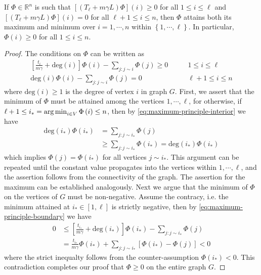 \documentclass[letterpaper]{article} %
\begin{document}
\begin{lemma}
  \label{lem:maximum-principle}
  If $\Phi\in\mathbb{R}^n$ is such that $\left[\left( T_{\ell}+m\gamma L \right)\Phi\right] \left(i\right)\geq 0$ for all $1\leq i\leq \ell$ and $\left[\left( T_{\ell}+m\gamma L \right)\Phi\right] \left(i\right)=0$ for all $\ell+1\leq i\leq n$, then $\Phi$ attains both its maximum and minimum over $i=1,\cdots,n$ within $\left\{ 1,\cdots,\ell \right\}$. In particular, $\Phi\left(i\right)\geq 0$ for all $1\leq i\leq n$.
\end{lemma}
\begin{proof}
  The conditions on $\Phi$ can be written as
  \begin{align}
      \left[\frac{t_i}{m\gamma}+\mathrm{deg}\left(i\right)\right]\Phi \left( i \right)-\sum_{j:j\sim i}\Phi \left( j \right)\geq 0 & \qquad 1\leq i\leq \ell\label{eq:maximum-principle-boundary}\\
      \mathrm{deg}\left(i\right)\Phi \left( i \right)-\sum_{j:j\sim i}\Phi \left( j \right)=0 & \qquad \ell+1\leq i\leq n\label{eq:maximum-principle-interior}
  \end{align}
  where $\mathrm{deg}\left( i \right)\geq 1$ is the degree of vertex $i$ in graph $G$. First, we assert that the minimum of $\Phi$ must be attained among the vertices $1,\cdots,\ell$, for otherwise, if $\ell+1\leq i_*=\mathop{\rm arg\, min}_{i\in V}\Phi \left( i \right)\leq n$, then by \eqref{eq:maximum-principle-interior} we have
  \begin{equation*}
    \begin{aligned}
      \mathrm{deg}\left(i_*\right)\Phi \left( i_* \right)&=\sum_{j:j\sim i_*}\Phi \left( j \right)\\
      &\geq \sum_{j:j\sim i_*}\Phi \left( i_* \right)=\mathrm{deg}\left(i_*\right)\Phi \left( i_* \right)
    \end{aligned}
  \end{equation*}
which implies $\Phi \left( j \right)=\Phi \left( i_* \right)$ for all vertices $j\sim i_*$. This argument can be repeated until the constant value propagates into the vertices within $1,\cdots,\ell$, and the assertion follows from the connectivity of the graph. The assertion for the maximum can be established analogously. Next we argue that the minimum of $\Phi$ on the vertices of $G$ must be non-negative. Assume the contracy, i.e. the minimum attained at $i_*\in \left[ 1,\ell \right]$ is strictly negative, then by \eqref{eq:maximum-principle-boundary} we have
\begin{equation*}
  \begin{aligned}
    0 &\leq \left[\frac{t_{i_*}}{m\gamma}+\mathrm{deg}\left(i_{*}\right)\right]\Phi \left( i_{*} \right)-\sum_{j:j\sim i_{*}}\Phi \left( j \right)\\
    &=\frac{t_{i_*}}{m\gamma}\Phi \left( i_* \right)+\sum_{j:j\sim i_*}\left[ \Phi \left( i_* \right)-\Phi \left( j \right) \right]<0
  \end{aligned}
\end{equation*}
 where the strict inequalty follows from the counter-assumption $\Phi \left( i_{*} \right)<0$. This contradiction completes our proof that $\Phi \geq 0$ on the entire graph $G$.
\end{proof}
\end{document}
